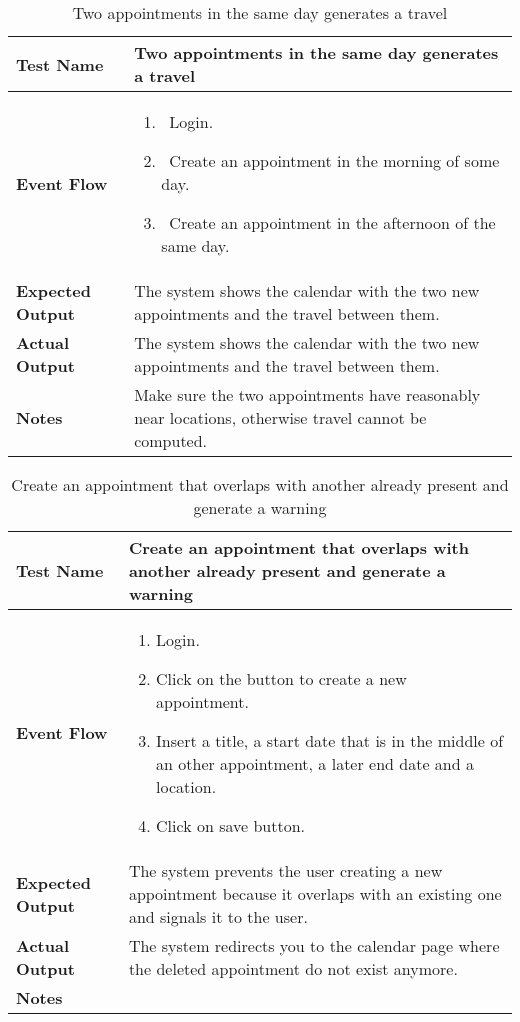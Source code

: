 \begin{table}[h]	
\centering
\def\arraystretch{1.5}
\begin{tabular}{|m{7cm}|m{7cm}|}
	\hline
	\textbf{Test Name}            &  Two appointments in the same day generates a travel  \\ \hline
	\textbf{Event Flow}             & 
		\begin{enumerate}
			\item~Login.
			\item~Create an appointment in the morning of some day.
			\item~Create an appointment in the afternoon of the same day.
		\end{enumerate}
	  \\ \hline
	\textbf{Expected Output}  &   The system shows the calendar with the two new appointments and the travel between them.  \\ \hline
	\textbf{Actual Output}       &  The system shows the calendar with the two new appointments and the travel between them.   \\ \hline
	\textbf{Notes} &  Make sure the two appointments have reasonably near locations, otherwise travel cannot be computed.  \\ \hline
\end{tabular}
\caption{Two appointments in the same day generates a travel}
\end{table}


\begin{table}[h]	
	\centering
	\def\arraystretch{1.5}
	\begin{tabular}{|m{7cm}|m{7cm}|}
		\hline
		\textbf{Test Name}            & Create an appointment that overlaps with another already present and generate a warning  \\ \hline
		\textbf{Event Flow}             & 
		\begin{enumerate}
			\item Login.
			\item Click on the button to create a new appointment.
			\item Insert a title, a start date that is in the middle of an other appointment, a later end date and a location.
			\item Click on save button.
		\end{enumerate} \\ \hline
		\textbf{Expected Output}  &  The system prevents the user creating a new appointment because it overlaps with an existing one and signals it to the user.  \\ \hline
		\textbf{Actual Output}       & The system redirects you to the calendar page where the deleted appointment do not exist anymore.    \\ \hline
		\textbf{Notes} & \\ \hline
	\end{tabular}
	\caption{ Create an appointment that overlaps with another already present and generate a warning }
\end{table}


